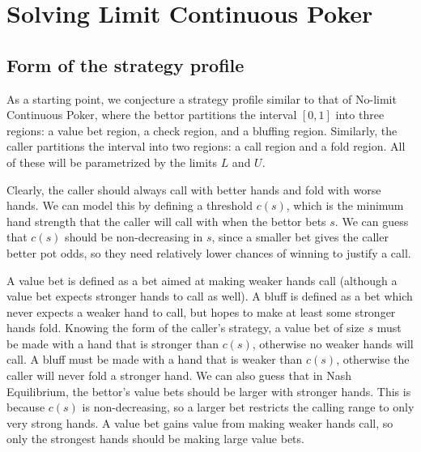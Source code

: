 \documentclass[a4paper,12pt]{article}
\theoremstyle{plain}
\theoremstyle{definition}
\begin{document}
\section{Solving Limit Continuous Poker}



\subsection{Form of the strategy profile}


As a starting point, we conjecture a strategy profile similar to that of No-limit Continuous Poker, where the bettor partitions the interval $[0, 1]$ into three regions: a value bet region, a check region, and a bluffing region. Similarly, the caller partitions the interval into two regions: a call region and a fold region. All of these will be parametrized by the limits $L$ and $U$. 

Clearly, the caller should always call with better hands and fold with worse hands.  We can model this by defining a threshold $c(s)$, which is the minimum hand strength that the caller will call with when the bettor bets $s$. We can guess that $c(s)$ should be non-decreasing in $s$, since a smaller bet gives the caller better pot odds, so they need relatively lower chances of winning to justify a call.

A value bet is defined as a bet aimed at making weaker hands call (although a value bet expects stronger hands to call as well). A bluff is defined as a bet which never expects a weaker hand to call, but hopes to make at least some stronger hands fold. Knowing the form of the caller's strategy, a value bet of size $s$ must be made with a hand that is stronger than $c(s)$, otherwise no weaker hands will call. A bluff must be made with a hand that is weaker than $c(s)$, otherwise the caller will never fold a stronger hand. We can also guess that in Nash Equilibrium, the bettor's value bets should be larger with stronger hands. This is because $c(s)$ is non-decreasing, so a larger bet restricts the calling range to only very strong hands. A value bet gains value from making weaker hands call, so only the strongest hands should be making large value bets. 
\end{document}
